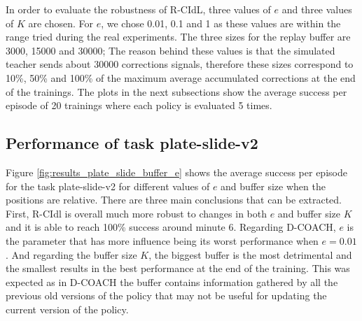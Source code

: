 In order to evaluate the robustness of R-CIdL, three values of $e$ and three values of $K$ are chosen. For $e$, we chose 0.01, 0.1 and 1 as these values are within the range tried during the real experiments. The three sizes for the replay buffer are 3000, 15000 and 30000; The reason behind these values is that the simulated teacher sends about 30000 corrections signals, therefore these sizes correspond to 10\%, 50\%  and 100\% of the maximum average accumulated corrections at the end of the trainings. The plots in the next subsections show the average success per episode of 20 trainings where each policy is evaluated 5 times.



\subsection{Performance of task plate-slide-v2}
\label{subsection:Performance of task plate_slide_v2}




Figure \ref{fig:results_plate_slide_buffer_e} shows the average success per episode for the task plate-slide-v2 for different values of $e$ and buffer size when the positions are relative. There are three main conclusions that can be extracted. First, R-CIdl is overall much more robust to changes in both $e$ and buffer size $K$ and it is able to reach 100\% success around minute 6. Regarding D-COACH, $e$ is the parameter that has more influence being its worst performance when $e=0.01$. And regarding the buffer size $K$, the biggest buffer is the most detrimental and the smallest results in the best performance at the end of the training.
This was expected as in D-COACH the buffer contains information gathered by all the previous old versions of the policy that may not be useful for updating the current version of the policy.


